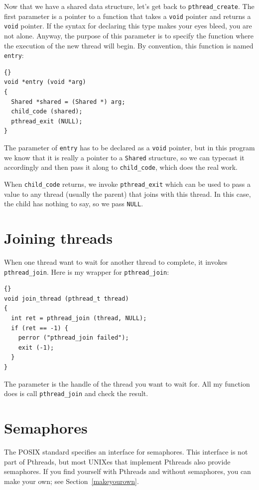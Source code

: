 \documentclass{book}
\begin{document}
Now that we have a shared data structure, let's get back to
{\tt pthread\_create}.
The first parameter is a pointer to a function that takes
a {\tt void} pointer and returns a {\tt void} pointer.  If the syntax
for declaring this type makes your eyes bleed, you are not alone.
Anyway, the purpose of this parameter is to specify the function where
the execution of the new thread will begin.  By convention, this
function is named {\tt entry}:

\begin{lstlisting}[caption={}]{}
void *entry (void *arg)
{
  Shared *shared = (Shared *) arg;
  child_code (shared);
  pthread_exit (NULL);
}
\end{lstlisting}

The parameter of {\tt entry} has to be declared as a {\tt void}
pointer, but in this program we know that it is really a pointer to a
{\tt Shared} structure, so we can typecast it accordingly and then
pass it along to {\tt child\_code}, which does the real work.

When {\tt child\_code} returns, we invoke {\tt pthread\_exit}
which can be used to pass a value to any thread (usually the
parent) that joins with this thread.  In this case, the child
has nothing to say, so we pass {\tt NULL}.


\section{Joining threads}

When one thread want to wait for another thread to complete,
it invokes {\tt pthread\_join}.
Here is my wrapper for {\tt pthread\_join}:

\begin{lstlisting}[caption={}]{}
void join_thread (pthread_t thread)
{
  int ret = pthread_join (thread, NULL);
  if (ret == -1) {
    perror ("pthread_join failed");
    exit (-1);
  }
}
\end{lstlisting}

The parameter is the handle of the thread you want to wait for.
All my function does is call {\tt pthread\_join} and check the
result.


\section{Semaphores}

The POSIX standard specifies an interface for semaphores.
This interface is not part of Pthreads, but most UNIXes
that implement Pthreads also provide semaphores.  If you
find yourself with Pthreads and without semaphores, you
can make your own; see Section~\ref{makeyourown}.
\end{document}

